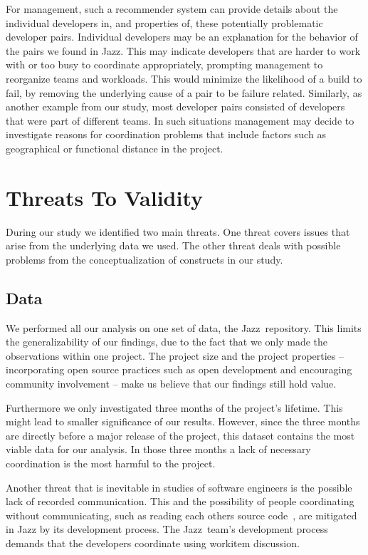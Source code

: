 For management, such a recommender system can provide details about the
individual developers in, and properties of, these potentially problematic
developer pairs. Individual developers may be an explanation for the behavior of
the pairs we found in Jazz\texttrademark. This may indicate developers that are
harder to work with or too busy to coordinate appropriately, prompting management
to reorganize teams and workloads. This would minimize the likelihood of a build
to fail, by removing the underlying cause of a pair to be failure related.
Similarly, as another example from our study, most developer pairs
consisted of developers that were part of different teams. In such
situations management may decide to investigate reasons for coordination
problems that include factors such as geographical or functional distance in the project.




\section{Threats To Validity}
\label{sec:threats}
During our study we identified two main threats. 
One threat covers issues that arise from the underlying data we used.
The other threat deals with possible problems from the conceptualization of
constructs in our study.

\subsection{Data}
We performed all our analysis on one set of data, the Jazz\texttrademark\
repository. This limits the generalizability of our findings, due to the fact
that we only made the observations within one project. The  
project size and the project properties -- incorporating open
source practices such as open development and encouraging community involvement
-- make us believe that our findings still hold value.

Furthermore we only investigated three months of the project's lifetime. This
might lead to smaller significance of our results. However, since the three
months are directly before a major release of the project, this dataset contains
the most viable data for our analysis. In those three months a lack of necessary
coordination is the most harmful to the project.

Another threat that is inevitable in studies of software engineers is
the possible lack of recorded communication. This and the possibility of people
coordinating without communicating, such as reading each others source
code~\cite{bolici:stc:2009}, are mitigated in Jazz by its development process.
The Jazz\texttrademark\ team's development process demands that the developers
coordinate using workitem discussion. 



